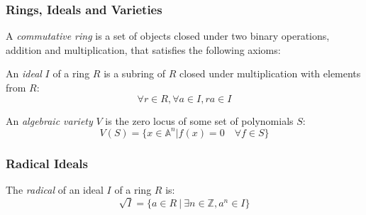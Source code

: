 \documentclass{beamer}
\begin{document}
\begin{frame}
\frametitle{Rings, Ideals and Varieties}
\begin{definition}
A {\it commutative ring} is a set of objects closed under two binary operations, addition and multiplication,
that satisfies the following axioms:
\end{definition}

\begin{definition}
An {\it ideal} $I$ of a ring $R$ is a subring of $R$ closed under multiplication with elements from $R$:
\[ \forall r \in R, \forall a \in I, ra \in I \]
\end{definition}

\begin{definition}
An {\it algebraic variety} $V$ is the zero locus of some set of polynomials $S$:
\[ V(S) = \{ x \in {\mathbb A}^n | f(x) = 0 \quad\forall f \in S \} \]
\end{definition}
\end{frame}

\begin{frame}
\frametitle{Radical Ideals}
\begin{definition}
The {\it radical} of an ideal $I$ of a ring $R$ is:
\[ \sqrt{I} = \{ a \in R \ | \ \exists n \in {\mathbb Z}, a^n \in I \} \]
\end{definition}
\end{frame}
\end{document}
